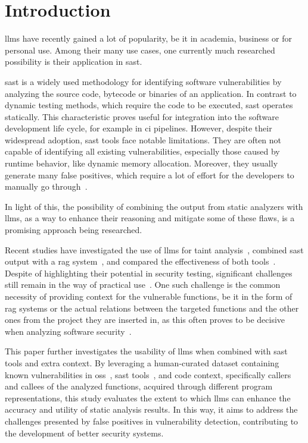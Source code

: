 \section{Introduction}
\label{sec:intro}
\Acp{llm} have recently gained a lot of popularity, be it in academia, business or for personal use.
Among their many use cases, one currently much researched possibility is their application in \ac{sast}.

\Acl{sast} is a widely used methodology for identifying software vulnerabilities by analyzing the source code, bytecode or binaries of an application.
In contrast to dynamic testing methods, which require the code to be executed, \ac{sast} operates statically.
This characteristic proves useful for integration into the software development life cycle, for example in \ac{ci} pipelines.
However, despite their widespread adoption, \ac{sast} tools face notable limitations.
They are often not capable of identifying all existing vulnerabilities, especially those caused by runtime behavior, like dynamic memory allocation.
Moreover, they usually generate many false positives, which require a lot of effort for the developers to manually go through~\cite{8804441}.

In light of this, the possibility of combining the output from static analyzers with \acp{llm}, as a way to enhance their reasoning and mitigate some of these flaws, is a promising approach being researched.

Recent studies have investigated the use of \acp{llm} for taint analysis~\cite{li2024llmassistedstaticanalysisdetecting}, combined \ac{sast} output with a \ac{rag} system~\cite{du2024vulragenhancingllmbasedvulnerability,keltek2024boostingcybersecurityvulnerabilityscanning}, and compared the effectiveness of both tools~\cite{zhou2024comparisonstaticapplicationsecurity}.
Despite of highlighting their potential in security testing, significant challenges still remain in the way of practical use~\cite{ding2024vulnerabilitydetectioncodelanguage}.
One such challenge is the common necessity of providing context for the vulnerable functions, be it in the form of \ac{rag} systems or the actual relations between the targeted functions and the other ones from the project they are inserted in, as this often proves to be decisive when analyzing software security~\cite{risse2024scorewrongexambenchmarking}.

This paper further investigates the usability of \acp{llm} when combined with \ac{sast} tools and extra context. 
By leveraging a human-curated dataset containing known vulnerabilities in \ac{oss}~\cite{BugOSS}, \ac{sast} tools~\cite{codeql,infer}, and code context, specifically callers and callees of the analyzed functions, acquired through different program representations, this study evaluates the extent to which \acp{llm} can enhance the accuracy and utility of static analysis results.
In this way, it aims to address the challenges presented by false positives in vulnerability detection, contributing to the development of better security systems.